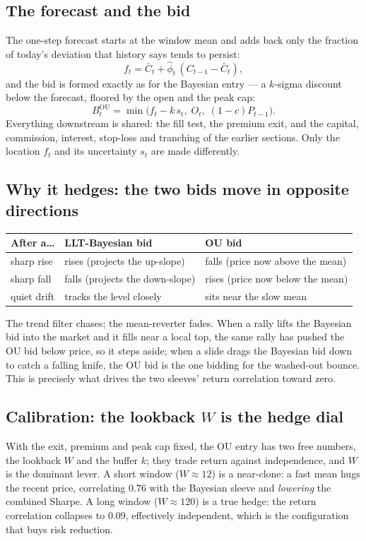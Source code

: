 \documentclass[11pt]{article}
\begin{document}
\subsection{The forecast and the bid}
The one-step forecast starts at the window mean and adds back only the fraction of today's
deviation that history says tends to persist:
\begin{equation}
f_t=\bar C_t+\hat\phi_t\,(C_{t-1}-\bar C_t),
\end{equation}
and the bid is formed exactly as for the Bayesian entry --- a $k$-sigma discount below the
forecast, floored by the open and the peak cap:
\begin{equation}
B_t^{\text{OU}}=\min\bigl(f_t-k\,s_t,\;O_t,\;(1-c)P_{t-1}\bigr).
\end{equation}
Everything downstream is shared: the fill test, the premium exit, and the capital, commission,
interest, stop-loss and tranching of the earlier sections. Only the location $f_t$ and its
uncertainty $s_t$ are made differently.

\subsection{Why it hedges: the two bids move in opposite directions}
\begin{table}[H]\centering\small
\begin{tabular}{lll}
\toprule
\textbf{After a\dots} & \textbf{LLT-Bayesian bid} & \textbf{OU bid}\\
\midrule
sharp rise & rises (projects the up-slope) & falls (price now above the mean)\\
sharp fall & falls (projects the down-slope) & rises (price now below the mean)\\
quiet drift & tracks the level closely & sits near the slow mean\\
\bottomrule
\end{tabular}
\end{table}
The trend filter chases; the mean-reverter fades. When a rally lifts the Bayesian bid into the
market and it fills near a local top, the same rally has pushed the OU bid below price, so it
steps aside; when a slide drags the Bayesian bid down to catch a falling knife, the OU bid is the
one bidding for the washed-out bounce. This is precisely what drives the two sleeves' return
correlation toward zero.

\subsection{Calibration: the lookback $W$ is the hedge dial}
With the exit, premium and peak cap fixed, the OU entry has two free numbers, the lookback $W$
and the buffer $k$; they trade return against independence, and $W$ is the dominant lever. A
short window ($W\approx12$) is a near-clone: a fast mean hugs the recent price, correlating
$0.76$ with the Bayesian sleeve and \emph{lowering} the combined Sharpe. A long window
($W\approx120$) is a true hedge: the return correlation collapses to $0.09$, effectively
independent, which is the configuration that buys risk reduction.
\end{document}
